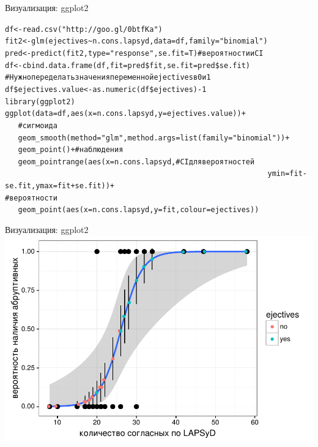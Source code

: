 \begin{frame}{Визуализация: ggplot2}
\scriptsize
\begin{alltt}
df <- read.csv("http://goo.gl/0btfKa")\\
fit2 <- \alert{glm(ejectives \textasciitilde n.cons.lapsyd}, data = df, \alert{family = "binomial")}\medskip\\
pred <- predict(fit2, type="response"{}, se.fit = T) \hfill \# вероятности и CI\\
df <- cbind.data.frame(df, fit = pred\$fit, se.fit = pred\$se.fit)\medskip\\
\# Нужно переделать значения переменной ejectives в 0 и 1\\
df\$ejectives.value <- \alert{as.numeric(}df\$ejectives\alert{) - 1}\medskip\\
library(ggplot2)\\
ggplot(data = df, aes(x = n.cons.lapsyd, y = ejectives.value))+\\
~~~\hfill \# сигмоида \\
~~~geom\_smooth(method = "glm"{}, method.args = list(family = "binomial"))+\\
~~~geom\_point() + \hfill \# наблюдения\\
\alert{~~~geom\_pointrange(aes(x = n.cons.lapsyd, \hfill \# CI для вероятностей\\
~~~~~~~~~~~~~~~~~~~~~~~~~~~~~~~~~~~~~~~~~~~~~~~~~~~~~~~~~~~~ymin = fit - se.fit, ymax = fit + se.fit))+\\
\hfill \# вероятности\\
~~~geom\_point(aes(x = n.cons.lapsyd, y = fit, colour = ejectives))} \\
\end{alltt}
\normalsize
\end{frame}
\begin{frame}{Визуализация: ggplot2}
\includegraphics[width=\linewidth]{logitsejitter.pdf}
\end{frame}
